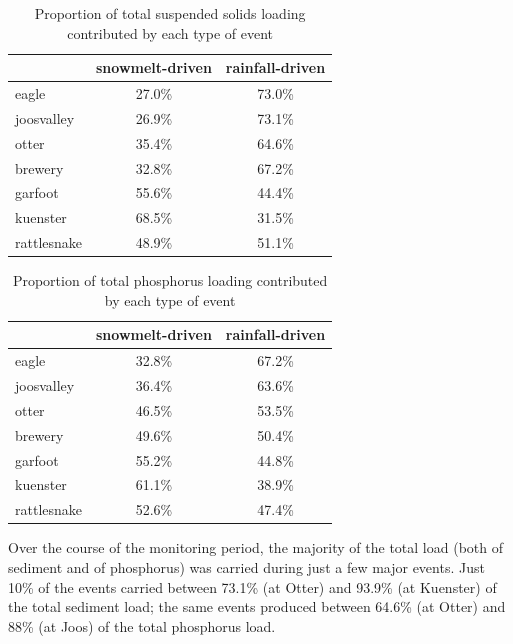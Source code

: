 \documentclass[12pt]{article}
\begin{document}
\begin{table}[ht]
\begin{center}
\begin{tabular}{lcc}
  & snowmelt-driven & rainfall-driven \\ 
  \hline
eagle & 27.0\% & 73.0\% \\ 
  joosvalley & 26.9\% & 73.1\% \\ 
  otter & 35.4\% & 64.6\% \\ 
  brewery & 32.8\% & 67.2\% \\ 
  garfoot & 55.6\% & 44.4\% \\ 
  kuenster & 68.5\% & 31.5\% \\ 
  rattlesnake & 48.9\% & 51.1\% \\ 
  \end{tabular}
\caption{Proportion of total suspended solids loading contributed by each type of event}
\label{tab:stot}
\end{center}
\end{table}
\begin{table}[ht]
\begin{center}
\begin{tabular}{lcc}
  & snowmelt-driven & rainfall-driven \\ 
  \hline
eagle & 32.8\% & 67.2\% \\ 
  joosvalley & 36.4\% & 63.6\% \\ 
  otter & 46.5\% & 53.5\% \\ 
  brewery & 49.6\% & 50.4\% \\ 
  garfoot & 55.2\% & 44.8\% \\ 
  kuenster & 61.1\% & 38.9\% \\ 
  rattlesnake & 52.6\% & 47.4\% \\ 
  \end{tabular}
\caption{Proportion of total phosphorus loading contributed by each type of event}
\label{tab:ptot}
\end{center}
\end{table}
Over the course of the monitoring period, the majority of the total load (both of sediment and of phosphorus) was carried during just a few major events. Just 10\% of the events carried between 73.1\% (at Otter) and 93.9\% (at Kuenster) of the total sediment load; the same events produced between 64.6\% (at Otter) and 88\% (at Joos) of the total phosphorus load.\\
\end{document}
